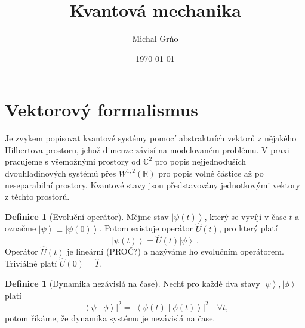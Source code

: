 \documentclass[10pt,a4paper]{article}
\theoremstyle{definition}
\newtheorem{definition}[theorem]{Definice}
\newcommand{\abs}[1]{\left| #1 \right|}
\newcommand{\ket}[1]{\left| #1 \right>}
\newcommand{\braket}[2]{\left< #1 \middle| #2 \right>}
\def\R{\mathbb{R}}
\def\C{\mathbb{C}}
\def\1{\hat{I}}
\begin{document}
\title{Kvantová mechanika}
\author{Michal Grňo}
\date{\today}

\maketitle

\section{Vektorový formalismus}
Je zvykem popisovat kvantové systémy pomocí abstraktních vektorů z nějakého Hilbertova prostoru, jehož dimenze závisí na modelovaném problému. V praxi pracujeme s všemožnými prostory od $\C^2$ pro popis nejjednoduších dvouhladinových systémů přes $W^{1,2}(\R)$ pro popis volné částice až po neseparabilní prostory. Kvantové stavy jsou představovány jednotkovými vektory z těchto prostorů.

\begin{definition}[Evoluční operátor]
    Mějme stav $\ket{\psi(t)}$, který se vyvíjí v čase $t$ a označme $\ket{\psi} \equiv \ket{\psi(0)}$. Potom existuje operátor $\hat{U}(t)$, pro který platí $$\ket{\psi(t)} = \hat{U}(t) \ket{\psi} \: .$$ Operátor $\hat{U}(t)$ je lineární (PROČ?) a nazýváme ho evolučním operátorem. Triviálně platí $\hat{U}(0) = \1$.
\end{definition}

\begin{definition}[Dynamika nezávislá na čase]
    Nechť pro každé dva stavy $\ket{\psi}, \ket{\phi}$ platí $$\abs{\braket{\psi}{\phi}}^2 = \abs{\braket{\psi(t)}{\phi(t)}}^2 \quad \forall t,$$ potom říkáme, že dynamika systému je nezávislá na čase.
\end{definition}
\end{document}
